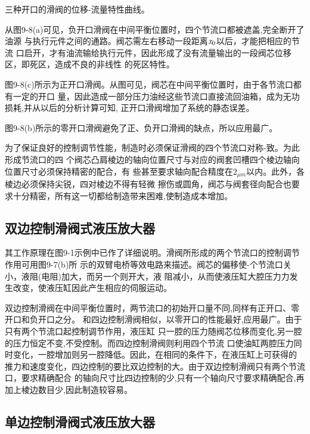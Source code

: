 
\noindent 三种开口的滑阀的位移-流量特性曲线。

从图9-8(a)可见，负开口滑阀在中间平衡位置时，四个节流口都被遮盖,完全断开了油源
与执行元件之间的通路。阀芯需左右移动一段距离$\emph{x}_0$以后，才能把相应的节流
口启开，才有油流输给执行元件，因此形成了没有流量输出的一段阀芯位移区，即死区，造成不良的非线性
的死区特性。

图9-8(c)所示为正开口滑阀。从图可见，阀芯在中间平衡位置时，由于各节流口都有一定的开口
量，因此造成一部分压力油经这些节流口直接流回油箱，成为无功损耗,并从以后的分析计算可知,
正开口滑阀增加了系统的静态误差。

图9-8(b)所示的零开口滑阀避免了正、负开口滑阀的缺点，所以应用最广。

为了保证良好的控制调节性能，制造时必须保证滑阀的四个节流口对称-致。为此形成节流口的四
个阀芯凸肩棱边的轴向位置尺寸与对应的阀套凹槽四个棱边轴向位置尺寸必须保持精密的配合，有
些甚至要求轴向配合精度在$2_{\mu m}$以内。此外，各棱边必须保持尖锐，四对棱边不得有轻微
擦伤或圆角，阀芯与阀套径向配合也要求十分精密，所有这一切都给制造带来困难,使制造成本增加。


\subsection{双边控制滑阀式液压放大器}
 
其工作原理在图9-1示例中已作了详细说明。滑阀所形成的两个节流口的控制调节作用可用图9-7(b)所
示的双臂电桥等效电路来描述。阀芯的偏移使-个节流口关小，液阻(电阻)加大，而另一个则开大，液
阻减小，从而使液压缸大腔压力力发生改变，使液压缸因此产生相应的伺服运动。

双边控制滑阀在中间平衡位置时，两节流口的初始开口量不同,同样有正开口、零开口和负开口之分。
和四边控制滑阀相似，以零开口的性能最好,应用最广。由于只有两个节流口起控制调节作用，液压缸
只一腔的压力随阀芯位移而变化,另一腔的压力恒定不变,不受控制。而四边控制滑阀则利用四个节流
口使油缸两腔压力同时变化，一腔增加则另一腔降低。因此，在相同的条件下，在液压缸上可获得的
推力和速度变化，四边控制的要比双边控制的大。由于双边控制滑阀只有两个节流口，要求精确配合
的轴向尺寸比四边控制的少,只有一个轴向尺寸要求精确配合,再加上棱边数目少,因此制造较容易。

\subsection{单边控制滑阀式液压放大器}

